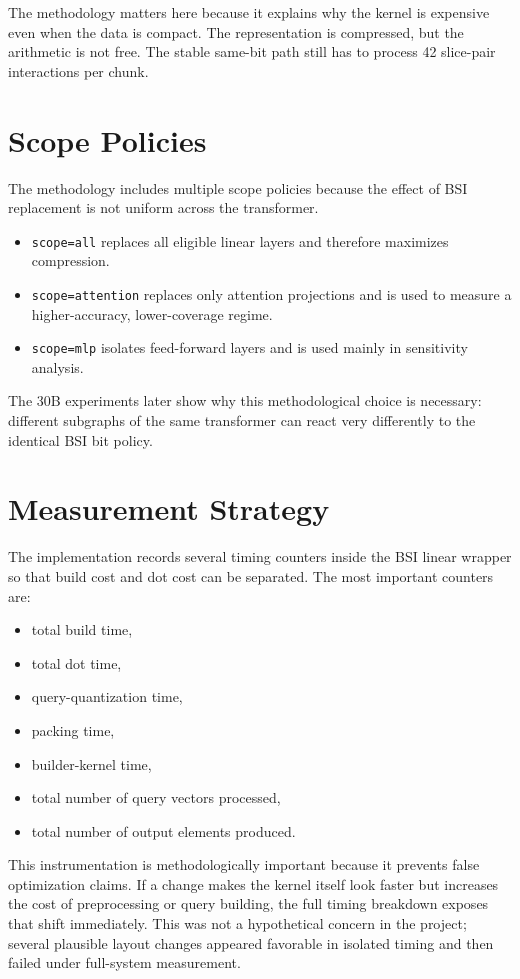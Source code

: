 The methodology matters here because it explains why the kernel is expensive even when the data is compact. The representation is compressed, but the arithmetic is not free. The stable same-bit path still has to process 42 slice-pair interactions per chunk.

\section{Scope Policies}
The methodology includes multiple scope policies because the effect of BSI replacement is not uniform across the transformer.

\begin{itemize}[leftmargin=2em]
\item \texttt{scope=all} replaces all eligible linear layers and therefore maximizes compression.
\item \texttt{scope=attention} replaces only attention projections and is used to measure a higher-accuracy, lower-coverage regime.
\item \texttt{scope=mlp} isolates feed-forward layers and is used mainly in sensitivity analysis.
\end{itemize}

The 30B experiments later show why this methodological choice is necessary: different subgraphs of the same transformer can react very differently to the identical BSI bit policy.

\section{Measurement Strategy}
The implementation records several timing counters inside the BSI linear wrapper so that build cost and dot cost can be separated. The most important counters are:

\begin{itemize}[leftmargin=2em]
\item total build time,
\item total dot time,
\item query-quantization time,
\item packing time,
\item builder-kernel time,
\item total number of query vectors processed,
\item total number of output elements produced.
\end{itemize}

This instrumentation is methodologically important because it prevents false optimization claims. If a change makes the kernel itself look faster but increases the cost of preprocessing or query building, the full timing breakdown exposes that shift immediately. This was not a hypothetical concern in the project; several plausible layout changes appeared favorable in isolated timing and then failed under full-system measurement.

